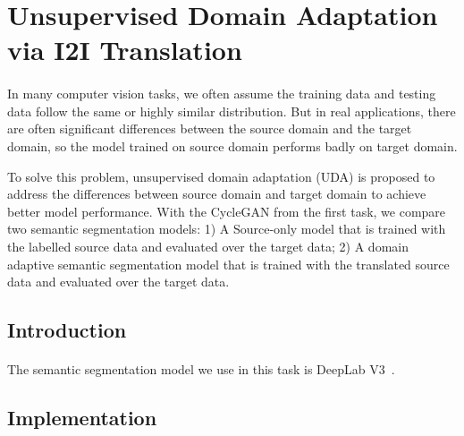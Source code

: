 \section{Unsupervised Domain Adaptation via I2I Translation}
\paragraph{}
In many computer vision tasks, we often assume the training data and testing data follow the same or highly similar distribution. But in real applications, there are often significant differences between the source domain and the target domain, so the model trained on source domain performs badly on target domain. 

To solve this problem, unsupervised domain adaptation (UDA) is proposed to address the differences between source domain and target domain to achieve better model performance. With the CycleGAN from the first task, we compare two semantic segmentation models: 1) A Source-only model that is trained with the labelled source data and evaluated over the target data; 2) A domain adaptive semantic segmentation model that is trained with the translated source data and evaluated over the target data.
\subsection{Introduction}
\paragraph{}
The semantic segmentation model we use in this task is DeepLab V3~\cite{2017Rethinking}. 
\subsection{Implementation}
